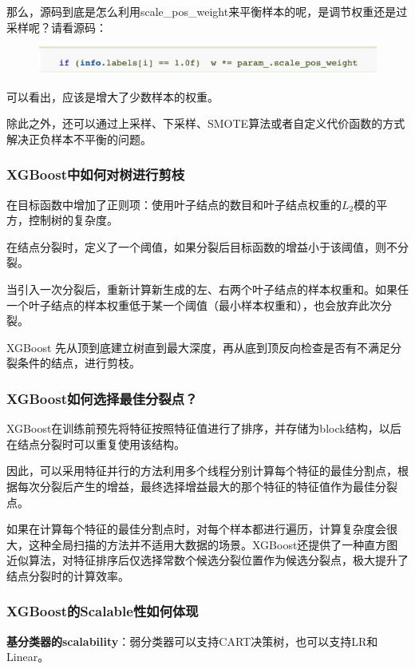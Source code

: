 \documentclass[12pt]{article}
\begin{document}
那么，源码到底是怎么利用scale\_pos\_weight来平衡样本的呢，是调节权重还是过采样呢？请看源码：
\begin{figure}[H]
    \centering
    \includegraphics[width=1\textwidth]{fig/XGBoost_Code_Sample_Weight.png}
\end{figure}
可以看出，应该是增大了少数样本的权重。

除此之外，还可以通过上采样、下采样、SMOTE算法或者自定义代价函数的方式解决正负样本不平衡的问题。

\subsubsection{XGBoost中如何对树进行剪枝}
在目标函数中增加了正则项：使用叶子结点的数目和叶子结点权重的$L_2$模的平方，控制树的复杂度。

在结点分裂时，定义了一个阈值，如果分裂后目标函数的增益小于该阈值，则不分裂。

当引入一次分裂后，重新计算新生成的左、右两个叶子结点的样本权重和。如果任一个叶子结点的样本权重低于某一个阈值（最小样本权重和），也会放弃此次分裂。

XGBoost 先从顶到底建立树直到最大深度，再从底到顶反向检查是否有不满足分裂条件的结点，进行剪枝。

\subsubsection{XGBoost如何选择最佳分裂点？ }
XGBoost在训练前预先将特征按照特征值进行了排序，并存储为block结构，以后在结点分裂时可以重复使用该结构。

因此，可以采用特征并行的方法利用多个线程分别计算每个特征的最佳分割点，根据每次分裂后产生的增益，最终选择增益最大的那个特征的特征值作为最佳分裂点。

如果在计算每个特征的最佳分割点时，对每个样本都进行遍历，计算复杂度会很大，这种全局扫描的方法并不适用大数据的场景。XGBoost还提供了一种直方图近似算法，对特征排序后仅选择常数个候选分裂位置作为候选分裂点，极大提升了结点分裂时的计算效率。

\subsubsection{XGBoost的Scalable性如何体现}
\textbf{基分类器的scalability}：弱分类器可以支持CART决策树，也可以支持LR和Linear。
\end{document}
